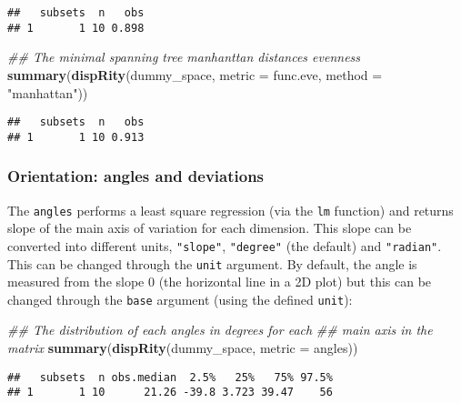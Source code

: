 \documentclass[
]{book}
\newenvironment{Shaded}{\begin{snugshade}}{\end{snugshade}}
\newcommand{\CommentTok}[1]{\textcolor[rgb]{0.56,0.35,0.01}{\textit{#1}}}
\newcommand{\DataTypeTok}[1]{\textcolor[rgb]{0.13,0.29,0.53}{#1}}
\newcommand{\KeywordTok}[1]{\textcolor[rgb]{0.13,0.29,0.53}{\textbf{#1}}}
\newcommand{\NormalTok}[1]{#1}
\newcommand{\StringTok}[1]{\textcolor[rgb]{0.31,0.60,0.02}{#1}}
\begin{document}
\begin{verbatim}
##   subsets  n   obs
## 1       1 10 0.898
\end{verbatim}

\begin{Shaded}
\begin{Highlighting}[]
\CommentTok{\#\# The minimal spanning tree manhanttan distances evenness}
\KeywordTok{summary}\NormalTok{(}\KeywordTok{dispRity}\NormalTok{(dummy\_space, }\DataTypeTok{metric =}\NormalTok{ func.eve,}
                 \DataTypeTok{method =} \StringTok{"manhattan"}\NormalTok{))}
\end{Highlighting}
\end{Shaded}

\begin{verbatim}
##   subsets  n   obs
## 1       1 10 0.913
\end{verbatim}

\hypertarget{orientation-angles-and-deviations}{%
\subsubsection{Orientation: angles and deviations}\label{orientation-angles-and-deviations}}

The \texttt{angles} performs a least square regression (via the \texttt{lm} function) and returns slope of the main axis of variation for each dimension. This slope can be converted into different units, \texttt{"slope"}, \texttt{"degree"} (the default) and \texttt{"radian"}. This can be changed through the \texttt{unit} argument.
By default, the angle is measured from the slope 0 (the horizontal line in a 2D plot) but this can be changed through the \texttt{base} argument (using the defined \texttt{unit}):

\begin{Shaded}
\begin{Highlighting}[]
\CommentTok{\#\# The distribution of each angles in degrees for each}
\CommentTok{\#\# main axis in the matrix}
\KeywordTok{summary}\NormalTok{(}\KeywordTok{dispRity}\NormalTok{(dummy\_space, }\DataTypeTok{metric =}\NormalTok{ angles))}
\end{Highlighting}
\end{Shaded}

\begin{verbatim}
##   subsets  n obs.median  2.5%   25%   75% 97.5%
## 1       1 10      21.26 -39.8 3.723 39.47    56
\end{verbatim}
\end{document}

